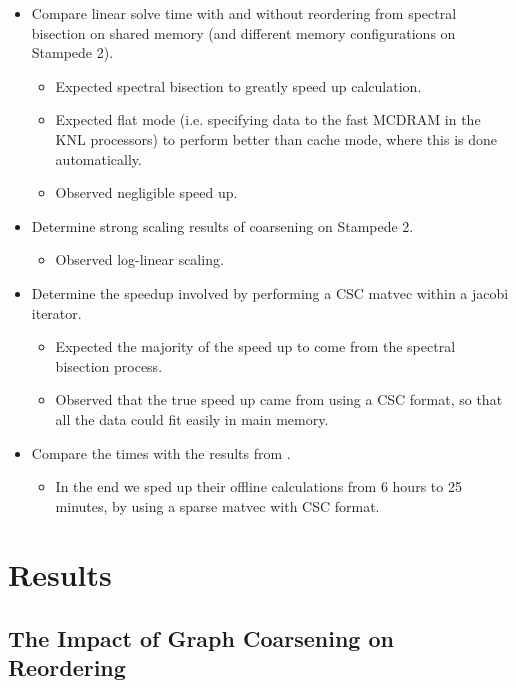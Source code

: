 \documentclass[11pt]{article}
\begin{document}
\begin{itemize}
	\item Compare linear solve time with and without reordering from
spectral bisection on shared memory (and different memory
		configurations on Stampede 2). 
		\begin{itemize}
			\item Expected spectral bisection to greatly speed up
				calculation. 
                        \item Expected flat mode (i.e. specifying data to the
fast MCDRAM in the KNL processors) to perform better than cache mode, where this
is done automatically.
			\item Observed negligible speed up.
		\end{itemize}
	
	\item Determine strong scaling results of coarsening on Stampede 2. 
		\begin{itemize}
			\item Observed log-linear scaling. 
		\end{itemize}
	\item Determine the speedup involved by performing a CSC matvec within a
		jacobi iterator. 
		\begin{itemize}
			\item Expected the majority of the speed up to come from
				the spectral bisection process. 
			\item Observed that the true speed up came from using a
				CSC format, so that all the data could fit
				easily in main memory. 
		\end{itemize}
	\item Compare the times with the results from \cite{xie}.
		\begin{itemize}
			\item In the end we sped up their offline calculations
				from 6 hours to 25 minutes, by using a sparse
				matvec with CSC format. 
		\end{itemize}
\end{itemize}

\section{Results}
\subsection{The Impact of Graph Coarsening on Reordering}
\end{document}
